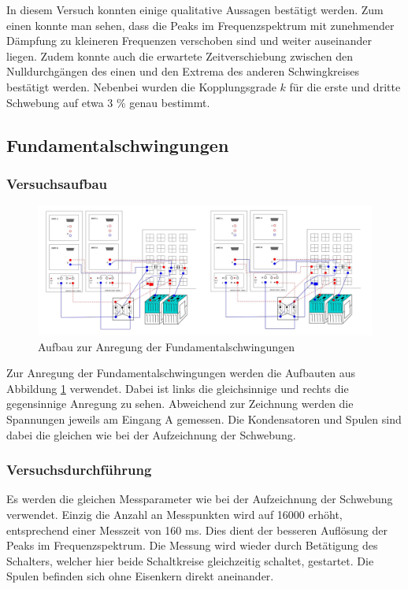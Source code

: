 In diesem Versuch konnten einige qualitative Aussagen bestätigt werden. Zum einen konnte man sehen, dass die Peaks im Frequenzspektrum mit zunehmender Dämpfung zu kleineren Frequenzen verschoben sind und weiter auseinander liegen. Zudem konnte auch die erwartete Zeitverschiebung zwischen den Nulldurchgängen des einen und den Extrema des anderen Schwingkreises bestätigt werden. Nebenbei wurden die Kopplungsgrade $k$ für die erste und dritte Schwebung auf etwa 3 \% genau bestimmt.



\subsection{Fundamentalschwingungen}


\subsubsection{Versuchsaufbau}

\begin{figure}[H]
\centering
\includegraphics[width=\textwidth]{bilder/aufbau_fundamental.jpg}
\caption{Aufbau zur Anregung der Fundamentalschwingungen}
\label{abb:aufbau_fundamental}
\end{figure}

Zur Anregung der Fundamentalschwingungen werden die Aufbauten aus Abbildung \ref{abb:aufbau_fundamental} verwendet. Dabei ist links die gleichsinnige und rechts die gegensinnige Anregung zu sehen. Abweichend zur Zeichnung werden die Spannungen jeweils am Eingang A gemessen. Die Kondensatoren und Spulen sind dabei die gleichen wie bei der Aufzeichnung der Schwebung.

\subsubsection{Versuchsdurchführung}

Es werden die gleichen Messparameter wie bei der Aufzeichnung der Schwebung verwendet. Einzig die Anzahl an Messpunkten wird auf 16000 erhöht, entsprechend einer Messzeit von 160 ms. Dies dient der besseren Auflösung der Peaks im Frequenzspektrum. Die Messung wird wieder durch Betätigung des Schalters, welcher hier beide Schaltkreise gleichzeitig schaltet, gestartet. Die Spulen befinden sich ohne Eisenkern direkt aneinander.


